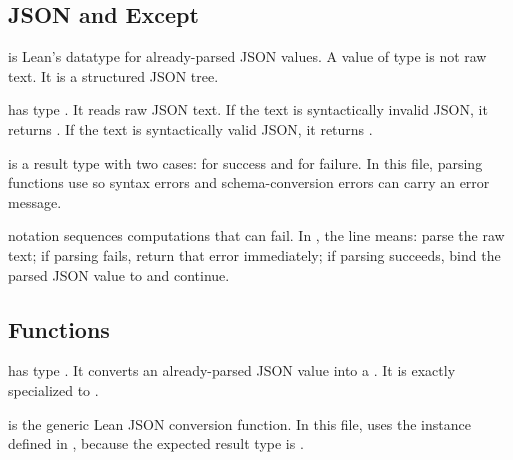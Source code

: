 \subsection{JSON and Except}

\begin{definition}[Json]
\code{[Json]} is Lean's datatype for already-parsed JSON values. A value of
type  is not raw text. It is a structured JSON tree.
\end{definition}

\begin{definition}
 has type . It reads raw
JSON text. If the text is syntactically invalid JSON, it returns
. If the text is syntactically valid JSON, it returns
.
\end{definition}

\begin{definition}
 is a result type with two cases:
 for success and  for failure.
In this file, parsing functions use  so syntax errors and
schema-conversion errors can carry an error message.
\end{definition}

\begin{definition}[do notation]
\code{[do]} notation sequences computations that can fail. In
, the line  means: parse the
raw text; if parsing fails, return that error immediately; if parsing succeeds,
bind the parsed JSON value to  and continue.
\end{definition}

\subsection{Functions}

\begin{definition}[parseDiffJson]
\code{[parseDiffJson]} has type . It converts
an already-parsed JSON value into a . It is exactly
 specialized to .
\end{definition}

\begin{definition}[fromJson?]
\code{[fromJson?]} is the generic Lean JSON conversion function. In this file,
 uses the  instance defined in
, because the expected result type is .
\end{definition}

